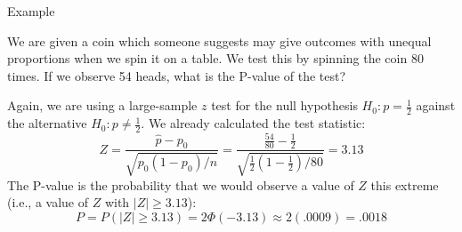 \documentclass{beamer}
\begin{document}
\begin{frame}{Example}
\begin{block}{}
We are given a coin which someone suggests may give outcomes with unequal proportions when we spin it on a table. We test this by spinning the coin 80 times. If we observe 54 heads, what is the P-value of the test?
\end{block}
\pause Again, we are using a large-sample $z$ test for the null hypothesis $H_0: p=\frac12$ against the alternative $H_0: p\neq\frac12$. \pause We already calculated the test statistic:
$$Z=\frac{\hat p-p_0}{\sqrt{p_0(1-p_0)/n}}=\frac{\frac{54}{80}-\frac12}{\sqrt{\frac12(1-\frac12)/80}}=3.13$$
\pause The P-value is the probability that we would observe a value of $Z$ this extreme (i.e., a value of $Z$ with $|Z|\geq 3.13$):
$$ P = P(|Z|\geq 3.13) = 2\Phi(-3.13) \approx 2(.0009) = .0018$$ 

\end{frame}
\end{document}
